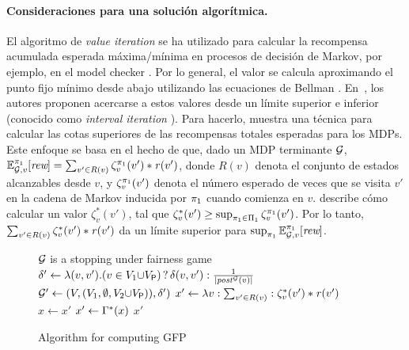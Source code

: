\paragraph{Consideraciones para una solución algorítmica.} 
El algoritmo de \emph{value iteration} \cite{Bellman57} se ha utilizado para calcular la recompensa acumulada esperada máxima/mínima en procesos de decisión de Markov, por ejemplo, en el model checker {\Prism}. Por lo general, el valor se calcula aproximando el punto fijo mínimo desde abajo utilizando las ecuaciones de Bellman \cite{Bellman57}. En~\cite{DBLP:conf/cav/Baier0L0W17}, los autores proponen acercarse a estos valores desde un límite superior e inferior (conocido como \emph{interval iteration} \cite{DBLP:journals/tcs/HaddadM18}). Para hacerlo, \cite{DBLP:conf/cav/Baier0L0W17} muestra una técnica para calcular las cotas superiores de las recompensas totales esperadas para los MDPs. Este enfoque se basa en el hecho de que, dado un MDP terminante $\mathcal{G}$, $\mathbb{E}^{\pi_{1}}_{\mathcal{G},v}[\textit{rew}] = \sum_{v' \in R(v)} \zeta_v^{\pi_{1}}(v')*\mathit{r}(v')$, donde $R(v)$ denota el conjunto de estados alcanzables desde $v$, y $\zeta_v ^{\pi_{1}}(v')$ denota el número esperado de veces que se visita $v'$ en la cadena de Markov
inducida por $\pi_{1}$ cuando comienza en $v$. \cite{DBLP:conf/cav/Baier0L0W17} describe cómo calcular un valor $\zeta_{v}^*(v')$, tal que $\zeta_v^*(v') \geq \sup_{\pi_{ 1} \in \Pi_{1}} \zeta_v^{\pi_{1}}(v')$. Por lo tanto, $\sum_{v' \in R(v)} \zeta_v^{*}(v')*\mathit{r}(v')$ da un límite superior para $\sup_{\pi_{1}} \mathbb{E}^{\pi_{1}}_{\mathcal{G},v}[\textit{rew}]$.
\begin{figure}
    \vspace{-9.5ex}
    \begin{minipage}{0.55\textwidth}
      \begin{algorithm}[H]
        \caption{Algorithm for computing GFP}\label{Alg:gfp}
        \begin{algorithmic}
          \REQUIRE $\mathcal{G}$ is a stopping under fairness game\\[1ex]
          \STATE $\delta' \gets  \lambda (v,v') {.} (v \in V_1 {\cup} V_{\mathsf{P}}) \mathop{?} \delta(v,v') : \frac{1}{|\mathit{post}^{\mathcal{G}}(v)|}$\\[-1ex]
          \STATE  $\mathcal{G}' \gets (V, (V_1, \emptyset, V_2{\cup}V_{\mathsf{P}})), \delta')$
          \STATE $x' \gets \lambda v : \sum_{v' \in R(v)} : \zeta^*_v(v')*\mathit{r}(v')$
          \REPEAT
          \STATE $x \gets x'$
          \STATE $x' \gets \Gamma^*(x)$
          \RETURN $x'$
        \end{algorithmic}
      \end{algorithm}
    \end{minipage}
  \end{figure}
